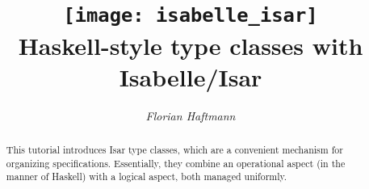 \documentclass[12pt,a4paper,fleqn]{article}
\title{\texttt{[image: isabelle\_isar]}
  \\[4ex] Haskell-style type classes with Isabelle/Isar}
\author{\emph{Florian Haftmann}}
\begin{document}
\maketitle

\begin{abstract}
  \noindent This tutorial introduces Isar type classes, which 
  are a convenient mechanism for organizing specifications.
  Essentially, they combine an operational aspect (in the
  manner of Haskell) with a logical aspect, both managed uniformly.
\end{abstract}

\thispagestyle{empty}\clearpage

\clearfirst



\begingroup
 \small\raggedright\frenchspacing

\endgroup
\end{document}
